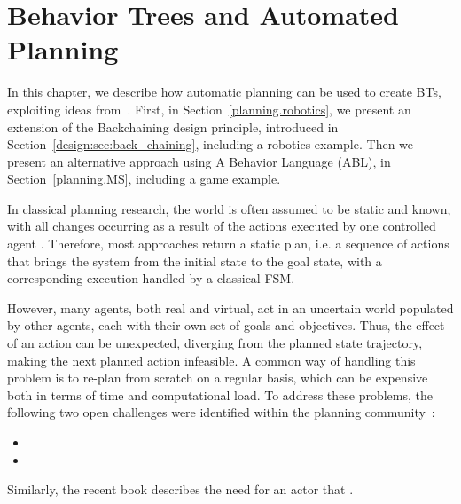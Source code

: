 



\graphicspath{{./planning/figures/}}



\chapter{Behavior Trees and Automated Planning}
\label{ch:planning}


In this chapter, we describe how automatic planning can be used to create BTs, exploiting ideas from~\cite{florez2008dynamic, weber2011building, weber2010reactive, colledanchise2016towards}.
First, in Section~\ref{planning.robotics},  we present an extension of the Backchaining design principle, introduced in Section~\ref{design:sec:back_chaining}, including a robotics example. Then we present an alternative approach using A Behavior Language (ABL), in Section~\ref{planning.MS}, including a game example.

In classical planning research, the world is often assumed to be static and known, with
all changes occurring as a result of the actions executed by one controlled agent  \cite{ghallab2016automated}.
Therefore, most approaches return a static plan, i.e. a sequence of actions that brings the system from the initial state to the goal state, with a corresponding execution handled by a classical FSM. 

However, many agents, both real and virtual, act in an uncertain world populated by
 other agents, each with their own set of goals and objectives. 
  Thus, the effect of an action can be unexpected, diverging from the planned state trajectory, making the next planned action infeasible.
  A common way of handling this problem is to  re-plan from scratch on a regular basis, which can be expensive both in terms of time and computational load.
 To address these problems, the following two open challenges were
 identified within the planning community~\cite{Ghallab14}:
\begin{itemize}
\item {}

\item {}
\end{itemize}
Similarly, the recent book \cite{ghallab2016automated} describes the need for an actor that 
.

